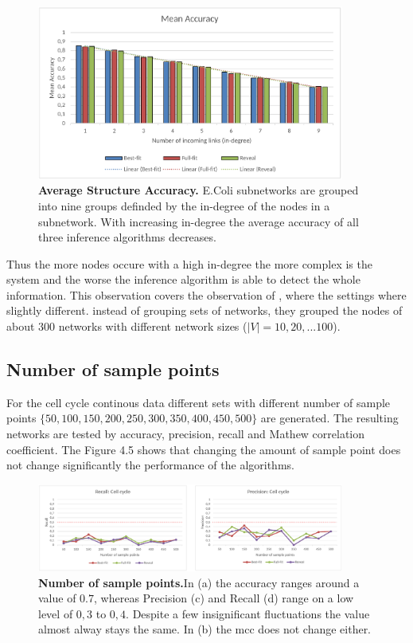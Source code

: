 \begin{figure}[H]
\centering
\includegraphics[width=0.9\textwidth]{./Bilder/Scoring/insilico/1_Indegree_Runtime/MeanAcc_indegree.pdf}
\caption[Average Structure Accuracy]{\textbf{Average Structure Accuracy.} E.Coli subnetworks are grouped into nine groups definded by the in-degree of the nodes in a subnetwork. With increasing in-degree the average accuracy of all three inference algorithms decreases. }
\label{fig:}
\end{figure}



Thus the more nodes occure with a high in-degree the more complex is the system and the worse the inference algorithm is able to detect the whole information. This observation covers the observation of \citep{10.1371/journal.pone.0171097}, where the settings where slightly different. instead of grouping sets of networks, they grouped the nodes of about 300 networks with different network sizes ($|V| = 10,20,$...$100$).\\

\subsection*{Number of sample points}
For the cell cycle continous data different sets with different number of sample points $\{50,100,150,200,250,300,350,400,450,500\}$ are generated. The resulting networks are tested by accuracy, precision, recall and Mathew correlation coefficient. The Figure 4.5 shows that changing the amount of sample point does not change significantly the performance of the algorithms.

\begin{figure}[H]
\centering\includegraphics[width=0.9\textwidth]{./Bilder/Scoring/insilico/2_cellcycle_measurements/RecPrec.pdf}
\caption[NumberOfPoints]{\textbf{Number of sample points.}In (a) the accuracy ranges around a value of $0.7$, whereas Precision (c) and Recall (d) range on a low level of $0,3$ to $0,4$. Despite a few insignificant fluctuations the value almost alway stays the same. In (b) the mcc does not change either.}
\label{fig:}
\end{figure}

